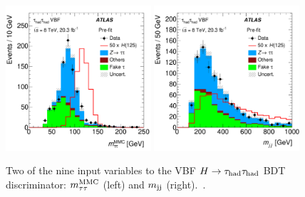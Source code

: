 \begin{figure}[tp]
  \centering
  \includegraphics[width=0.48\textwidth]{figures/HIGG-2013-32/figaux_09d}
  \includegraphics[width=0.48\textwidth]{figures/HIGG-2013-32/figaux_09c}
  \caption{Two of the nine input variables to the VBF $H\rightarrow\tau_\text{had}\tau_\text{had}$ BDT discriminator: $m_{\tau\tau}^\text{MMC}$ (left) and $m_{\text{jj}}$ (right).~\cite{HIGG-2013-32}.}
  \label{fig:backgrounds-hadhad}
\end{figure}

